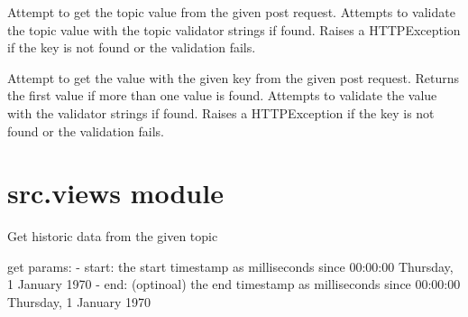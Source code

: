 \documentclass[letterpaper,10pt,english]{sphinxmanual}
\begin{document}

\begin{fulllineitems}
\label{\detokenize{src:src.utils.try_get_topic}}
Attempt to get the topic value from the given post request.
Attempts to validate the topic value with the topic validator strings if found.
Raises a HTTPException if the key is not found or the validation fails.

\end{fulllineitems}


\begin{fulllineitems}
\label{\detokenize{src:src.utils.try_get_validate}}
Attempt to get the value with the given key from the given post request.
Returns the first value if more than one value is found.
Attempts to validate the value with the validator strings if found.
Raises a HTTPException if the key is not found or the validation fails.

\end{fulllineitems}



\section{src.views module}
\label{\detokenize{src:module-src.views}}\label{\detokenize{src:src-views-module}}

\begin{fulllineitems}
\label{\detokenize{src:src.views.history}}
Get historic data from the given topic

get params:
- start: the start timestamp as milliseconds since 00:00:00 Thursday, 1 January 1970
- end: (optinoal) the end timestamp as milliseconds since 00:00:00 Thursday, 1 January 1970

\end{fulllineitems}
\end{document}
